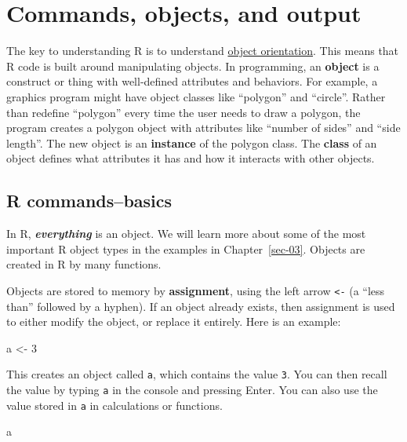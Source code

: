 \documentclass[
  13,
  letterpaper,
]{report}
\newenvironment{Shaded}{\begin{snugshade}}{\end{snugshade}}
\newcommand{\DecValTok}[1]{\textcolor[rgb]{0.68,0.00,0.00}{#1}}
\newcommand{\NormalTok}[1]{\textcolor[rgb]{0.00,0.23,0.31}{#1}}
\newcommand{\OtherTok}[1]{\textcolor[rgb]{0.00,0.23,0.31}{#1}}
\begin{document}
\section{Commands, objects, and output}\label{sec-02-comm}

The key to understanding R is to understand
\href{https://en.wikipedia.org/wiki/Object-oriented_programming}{object
orientation}. This means that R code is built around manipulating
objects. In programming, an \textbf{object} is a construct or thing with
well-defined attributes and behaviors. For example, a graphics program
might have object classes like ``polygon'' and ``circle''. Rather than
redefine ``polygon'' every time the user needs to draw a polygon, the
program creates a polygon object with attributes like ``number of
sides'' and ``side length''. The new object is an \textbf{instance} of
the polygon class. The \textbf{class} of an object defines what
attributes it has and how it interacts with other objects.

\subsection{R commands--basics}\label{sec-02-comm-basic}

In R, \textbf{\emph{everything}} is an object. We will learn more about
some of the most important R object types in the examples in
Chapter~\ref{sec-03}. Objects are created in R by many functions.

Objects are stored to memory by \textbf{assignment}, using the left
arrow \texttt{\textless{}-} (a ``less than'' followed by a hyphen). If
an object already exists, then assignment is used to either modify the
object, or replace it entirely. Here is an example:

\begin{Shaded}
\begin{Highlighting}[]
\NormalTok{a }\OtherTok{\textless{}{-}} \DecValTok{3}
\end{Highlighting}
\end{Shaded}

This creates an object called \texttt{a}, which contains the value
\texttt{3}. You can then recall the value by typing \texttt{a} in the
console and pressing Enter. You can also use the value stored in
\texttt{a} in calculations or functions.

\begin{Shaded}
\begin{Highlighting}[]
\NormalTok{a}
\end{Highlighting}
\end{Shaded}
\end{document}
